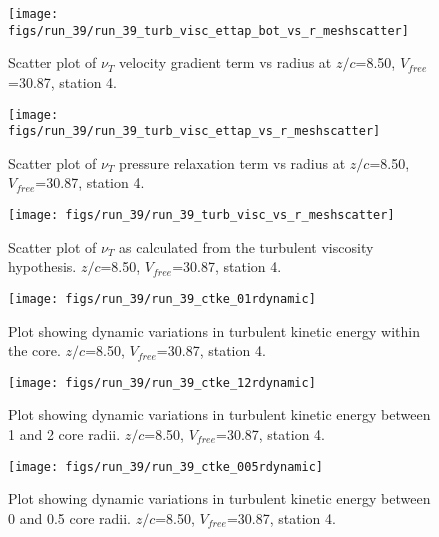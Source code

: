 \begin{figure}[H]
\centering
\texttt{[image: figs/run\_39/run\_39\_turb\_visc\_ettap\_bot\_vs\_r\_meshscatter]}
\caption{Scatter plot of $\nu_T$ velocity gradient term vs radius at $z/c$=8.50, $V_{free}$=30.87, station 4.}
\end{figure}


\begin{figure}[H]
\centering
\texttt{[image: figs/run\_39/run\_39\_turb\_visc\_ettap\_vs\_r\_meshscatter]}
\caption{Scatter plot of $\nu_T$ pressure relaxation term vs radius at $z/c$=8.50, $V_{free}$=30.87, station 4.}
\end{figure}


\begin{figure}[H]
\centering
\texttt{[image: figs/run\_39/run\_39\_turb\_visc\_vs\_r\_meshscatter]}
\caption{Scatter plot of $\nu_T$ as calculated from the turbulent viscosity hypothesis. $z/c$=8.50, $V_{free}$=30.87, station 4.}
\end{figure}


\begin{figure}[H]
\centering
\texttt{[image: figs/run\_39/run\_39\_ctke\_01rdynamic]}
\caption{Plot showing dynamic variations in turbulent kinetic energy within the core. $z/c$=8.50, $V_{free}$=30.87, station 4.}
\end{figure}


\begin{figure}[H]
\centering
\texttt{[image: figs/run\_39/run\_39\_ctke\_12rdynamic]}
\caption{Plot showing dynamic variations in turbulent kinetic energy between 1 and 2 core radii. $z/c$=8.50, $V_{free}$=30.87, station 4.}
\end{figure}


\begin{figure}[H]
\centering
\texttt{[image: figs/run\_39/run\_39\_ctke\_005rdynamic]}
\caption{Plot showing dynamic variations in turbulent kinetic energy between 0 and 0.5 core radii. $z/c$=8.50, $V_{free}$=30.87, station 4.}
\end{figure}



